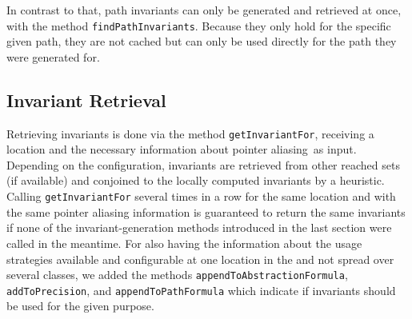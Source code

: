 In contrast to that, path invariants can only be generated and retrieved at once, with the method \texttt{findPathInvariants}. Because they only hold for the specific given path, they are not cached but 
can only be used directly for the path they were generated for.

\subsection{Invariant Retrieval}
Retrieving invariants is done via the method \texttt{getInvariantFor}, receiving a location and the necessary information about pointer aliasing\, as input. Depending on the configuration, invariants 
are retrieved from other reached sets (if available) and conjoined to the locally computed invariants by a heuristic. Calling \texttt{getInvariantFor} several times in a row for the same location 
and with the same pointer aliasing information is guaranteed to return the same invariants if none of the invariant-generation methods introduced in the last section were called in the meantime. 
For also having the information about the usage strategies available and configurable at one location in the \PredicateCPA{} and not spread over several classes, we added the methods 
\texttt{appendToAbstractionFormula}, \texttt{addToPrecision}, and \texttt{appendToPathFormula}  which indicate if invariants should be used for the given purpose.